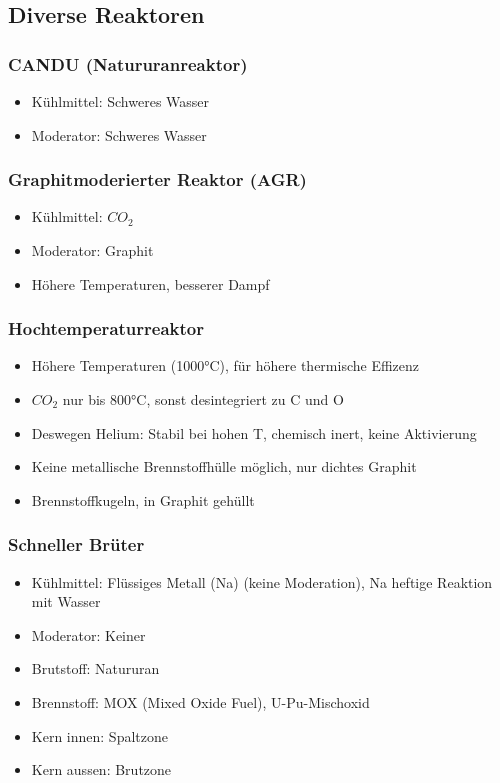 \documentclass[12pt]{article}
\begin{document}
\subsection{Diverse Reaktoren}

\subsubsection{CANDU (Natururanreaktor)}
\begin{itemize}
  \item Kühlmittel: Schweres Wasser
  \item Moderator: Schweres Wasser
\end{itemize}

\subsubsection{Graphitmoderierter Reaktor (AGR)}
\begin{itemize}
  \item Kühlmittel: \(CO_2\)
  \item Moderator: Graphit
  \item Höhere Temperaturen, besserer Dampf
\end{itemize}

\subsubsection{Hochtemperaturreaktor}
\begin{itemize}
  \item Höhere Temperaturen (1000°C), für höhere thermische Effizenz
  \item \(CO_2\) nur bis 800°C, sonst desintegriert zu C und O
  \item Deswegen Helium: Stabil bei hohen T, chemisch inert, keine Aktivierung
  \item Keine metallische Brennstoffhülle möglich, nur dichtes Graphit
  \item Brennstoffkugeln, in Graphit gehüllt
\end{itemize}

\subsubsection{Schneller Brüter}
\begin{itemize}
  \item Kühlmittel: Flüssiges Metall (Na) (keine Moderation), Na heftige Reaktion mit Wasser
  \item Moderator: Keiner
  \item Brutstoff: Natururan
  \item Brennstoff: MOX (Mixed Oxide Fuel), U-Pu-Mischoxid
  \item Kern innen: Spaltzone
  \item Kern aussen: Brutzone
\end{itemize}
\end{document}
